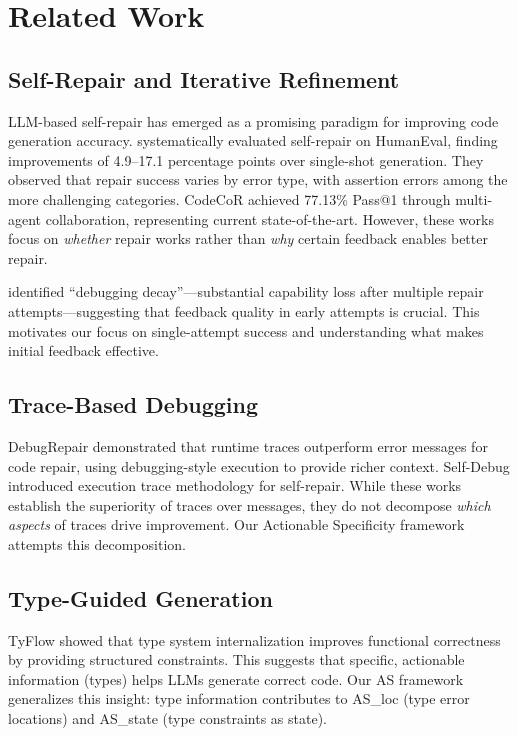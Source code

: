 \section{Related Work}

\subsection{Self-Repair and Iterative Refinement}

LLM-based self-repair has emerged as a promising paradigm for improving code generation accuracy. \citet{howmanytries2026} systematically evaluated self-repair on HumanEval, finding improvements of 4.9--17.1 percentage points over single-shot generation. They observed that repair success varies by error type, with assertion errors among the more challenging categories. CodeCoR \citep{codecor2025} achieved 77.13\% Pass@1 through multi-agent collaboration, representing current state-of-the-art. However, these works focus on \emph{whether} repair works rather than \emph{why} certain feedback enables better repair.

\citet{debuggingdecay2025} identified ``debugging decay''---substantial capability loss after multiple repair attempts---suggesting that feedback quality in early attempts is crucial. This motivates our focus on single-attempt success and understanding what makes initial feedback effective.

\subsection{Trace-Based Debugging}

DebugRepair \citep{debugrepair2026} demonstrated that runtime traces outperform error messages for code repair, using debugging-style execution to provide richer context. Self-Debug \citep{selfdebug2023} introduced execution trace methodology for self-repair. While these works establish the superiority of traces over messages, they do not decompose \emph{which aspects} of traces drive improvement. Our Actionable Specificity framework attempts this decomposition.

\subsection{Type-Guided Generation}

TyFlow \citep{tyflow2025} showed that type system internalization improves functional correctness by providing structured constraints. This suggests that specific, actionable information (types) helps LLMs generate correct code. Our AS framework generalizes this insight: type information contributes to AS\_loc (type error locations) and AS\_state (type constraints as state).

